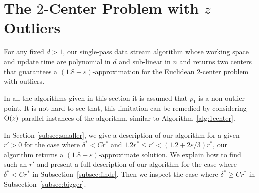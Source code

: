 \documentclass[envcountsame]{cls/cccg15}
\newcommand{\cO}{\ensuremath{{\rm O}}}
\newcommand{\lee}{\leqslant}
\newcommand{\gee}{\geqslant}
\renewcommand{\le}{\lee}
\renewcommand{\ge}{\gee}
\newcommand{\eps}{\varepsilon}
\begin{document}
\section{The $2$-Center Problem with $z$ Outliers}

\begin{theorem}
For any fixed $d > 1$, our single-pass data stream algorithm whose working space and update time are polynomial in $d$ and sub-linear in $n$ and returns two centers that guarantees a $(1.8 + \eps)$-approximation for the Euclidean $2$-center problem with outliers.
\end{theorem}


In all the algorithms given in this section it is assumed that $p_1$ is a non-outlier point. It is not hard to see that, this limitation can be remedied by considering $\cO(z)$ parallel instances of the algorithm, similar to Algorithm~\ref{alg:1center}.

In Section \ref{subsec:smaller}, we give a description of our algorithm for a given $r' > 0$ for the case where $\delta^* < C r^*$ and $1.2r^* \le r' < (1.2 + 2\eps/3)r^*$, our algorithm returns a $(1.8 + \eps)$-approximate solution. We explain how to find such an $r'$ and present a full description of our algorithm for the case where $\delta^* < C r^*$ in Subsection~\ref{subsec:findr}. Then we inspect the case where $\delta^* \ge C r^*$ in Subsection~\ref{subsec:bigger}.
\end{document}
